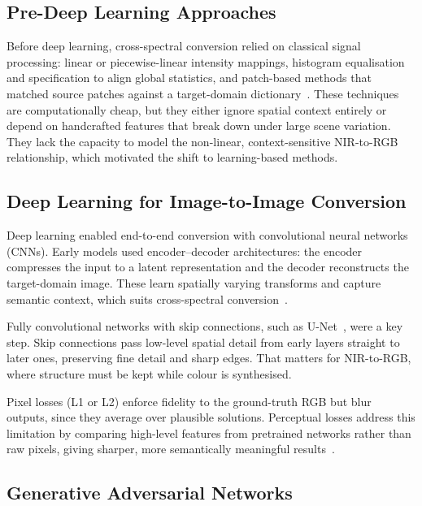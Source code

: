 \subsection{Pre-Deep Learning Approaches}
\label{sec:i2i_classical}

Before deep learning, cross-spectral conversion relied on classical signal processing: linear or piecewise-linear intensity mappings, histogram equalisation and specification to align global statistics, and patch-based methods that matched source patches against a target-domain dictionary~\cite{efros1999texture}. These techniques are computationally cheap, but they either ignore spatial context entirely or depend on handcrafted features that break down under large scene variation. They lack the capacity to model the non-linear, context-sensitive NIR-to-RGB relationship, which motivated the shift to learning-based methods.

\subsection{Deep Learning for Image-to-Image Conversion}
\label{sec:i2i_dl}

Deep learning enabled end-to-end conversion with convolutional neural networks (CNNs). Early models used encoder--decoder architectures: the encoder compresses the input to a latent representation and the decoder reconstructs the target-domain image. These learn spatially varying transforms and capture semantic context, which suits cross-spectral conversion~\cite{dong2015image}.

Fully convolutional networks with skip connections, such as U-Net~\cite{ronneberger2015unet}, were a key step. Skip connections pass low-level spatial detail from early layers straight to later ones, preserving fine detail and sharp edges. That matters for NIR-to-RGB, where structure must be kept while colour is synthesised.

Pixel losses (L1 or L2) enforce fidelity to the ground-truth RGB but blur outputs, since they average over plausible solutions. Perceptual losses address this limitation by comparing high-level features from pretrained networks rather than raw pixels, giving sharper, more semantically meaningful results~\cite{johnson2016perceptual}.

\subsection{Generative Adversarial Networks}
\label{sec:i2i_gan}

